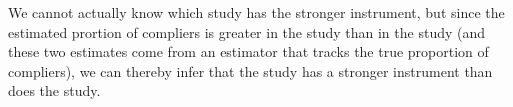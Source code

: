 \documentclass[11pt]{article}\usepackage[]{graphicx}\usepackage[]{color}
\theoremstyle{newstyle}
\begin{document}
We cannot actually know which study has the stronger instrument, but since the estimated prortion of compliers is greater in the \citet{arceneaux2005} study than in the \citet{albertsonlawrence2009} study (and these two estimates come from an estimator that tracks the true proportion of compliers), we can thereby infer that the \citet{arceneaux2005} study has a stronger instrument than does the \citet{albertsonlawrence2009} study.

\newpage

\begin{singlespace}

\end{singlespace}
\end{document}
